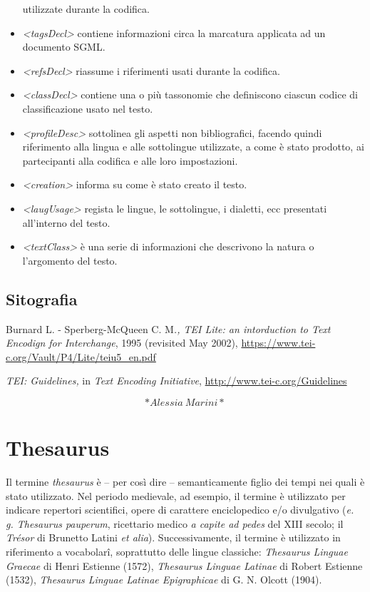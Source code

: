 \documentclass[
  b5paper,
  twoside,
  12pt,
  chapterprefix=false,
  bibliography=totocnumbered,
  parskip=false]{scrbook}
\begin{document}
\begin{itemize}
  utilizzate durante la codifica.
\item
  \emph{\textless tagsDecl\textgreater{}} contiene informazioni circa la marcatura applicata ad un
  documento SGML.
\item
  \emph{\textless refsDecl\textgreater{}} riassume i riferimenti usati durante la codifica.
\item
  \emph{\textless classDecl\textgreater{}} contiene una o più tassonomie che definiscono ciascun
  codice di classificazione usato nel testo.
\item
  \emph{\textless profileDesc\textgreater{}} sottolinea gli aspetti non bibliografici, facendo quindi riferimento alla lingua e alle sottolingue utilizzate, a come è stato prodotto, ai partecipanti alla codifica e alle loro impostazioni.
\item
  \emph{\textless creation\textgreater{}} informa su come è stato creato il testo.
\item
  \emph{\textless laugUsage\textgreater{}} regista le lingue, le sottolingue, i dialetti, ecc
  presentati all'interno del testo.
\item
  \emph{\textless textClass\textgreater{}} è una serie di informazioni che descrivono la natura o
  l'argomento del testo.
\end{itemize}

\hypertarget{sitografia-32}{%
\section*{Sitografia}\label{sitografia-32}}

Burnard L. - Sperberg-McQueen C. M\emph{., TEI Lite: an intorduction to Text
Encodign for Interchange}, 1995 (revisited May 2002),
\url{https://www.tei-c.org/Vault/P4/Lite/teiu5_en.pdf}

\emph{TEI: Guidelines,} in \emph{Text Encoding Initiative},
\url{http://www.tei-c.org/Guidelines}

\[*Alessia~Marini*\]

\hypertarget{thesaurus}{%
\chapter{Thesaurus}\label{thesaurus}}

Il termine \emph{thesaurus} è -- per così dire -- semanticamente figlio dei
tempi nei quali è stato utilizzato. Nel periodo medievale, ad esempio,
il termine è utilizzato per indicare repertori scientifici, opere di
carattere enciclopedico e/o divulgativo (\emph{e. g. Thesaurus pauperum},
ricettario medico \emph{a capite ad pedes} del XIII secolo; il \emph{Trésor} di
Brunetto Latini \emph{et alia}). Successivamente, il termine è utilizzato in
riferimento a vocabolarî, soprattutto delle lingue classiche: \emph{Thesaurus
Linguae Graecae} di Henri Estienne (1572), \emph{Thesaurus Linguae Latinae}
di Robert Estienne (1532), \emph{Thesaurus Linguae Latinae Epigraphicae} di
G. N. Olcott (1904).
\end{document}
